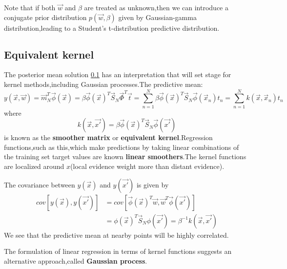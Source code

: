 Note that if both $\vec{w}$ and $\beta$ are treated as unknown,then we can introduce a conjugate prior distribution $p(\vec{w},\beta)$ given by Gaussian-gamma distribution,leading to a Student's t-distribution predictive distribution.

\subsection{Equivalent kernel}
The posterior mean solution \ref{} has an interpretation that will set stage for kernel methods,including Gaussian processes.The predictive mean:
\begin{equation}
y(\vec{x},\vec{w})=\vec{m}_N^T\vec{\phi}(\vec{x})
=\beta\vec{\phi}(\vec{x})^T\vec{S}_N\vec{\Phi}^T\vec{t}
=\sum_{n=1}^{N}\beta\vec{\phi}(\vec{x})^T\vec{S}_N\vec{\phi}(\vec{x}_n)t_n
=\sum_{n=1}^{N}\mathit{k}(\vec{x},\vec{x}_n)t_n
\end{equation}
where
\begin{equation}
k(\vec{x},\vec{x'})
=\beta\vec{\phi}(\vec{x})^T\vec{S}_N\vec{\phi}(\vec{x'})
\end{equation}
is known as the \textbf{smoother matrix} or \textbf{equivalent kernel}.Regression functions,such as this,which make predictions by taking linear combinations of the training set target values are known \textbf{linear smoothers}.The kernel functions are localized around $x$(local evidence weight more than distant evidence).

The covariance between $y(\vec{x})$ and $y(\vec{x'})$ is given by
\begin{align}
cov[y(\vec{x}),y(\vec{x'})] &=cov[\vec{\phi}(\vec{x})^T\vec{w},\vec{w}^T\vec{\phi}(\vec{x'})] \\
&=\phi(\vec{x})^T\vec{S}_N\phi(\vec{x'})=\beta^{-1}\mathit{k}(\vec{x},\vec{x'})
\end{align}
We see that the predictive mean at nearby points will be highly correlated.

The formulation of linear regression in terms of kernel functions suggests an alternative approach,called \textbf{Gaussian process}.















